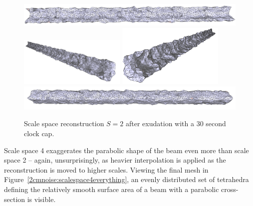 \documentclass[12pt]{drexelthesis}
\begin{document}
\begin{figure}[!ht]
	\centering
		\includegraphics[width=5in]{simulated-lab-scan/2cmnoise/optimizedNeat/scalespace2everything00.png}
		\includegraphics[width=2in]{simulated-lab-scan/2cmnoise/optimizedNeat/scalespace2everything01.png}
		\includegraphics[width=2in]{simulated-lab-scan/2cmnoise/optimizedNeat/scalespace2everything02.png}
		\includegraphics[width=5in]{simulated-lab-scan/2cmnoise/optimizedNeat/scalespace2everything03.png}
		\caption[Scale space reconstruction $S = 2$ after after exudation with a 30 second clock cap]{\centering Scale space reconstruction $S = 2$ after exudation with a 30 second clock cap.}
	\label{2cmnoise:scalespace2everything}
\end{figure}

Scale space 4 exaggerates the parabolic shape of the beam even more than scale space 2 -- again, unsurprisingly, as heavier interpolation is applied as the reconstruction is moved to higher scales. Viewing the final mesh in Figure~\ref{2cmnoise:scalespace4everything}, an evenly distributed set of tetrahedra defining the relatively smooth surface area of a beam with a parabolic cross-section is visible.
\end{document}
